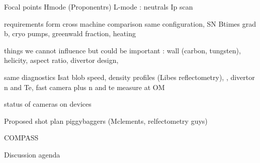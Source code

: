 \documentclass[10pt, compress, draft]{beamer}
\begin{document}
\begin{frame}{Focal points}
	Hmode (Proponentrs)
	L-mode :  neutrals Ip scan
\end{frame}

\begin{frame}{requirements form cross machine comparison }
same configuration, SN Btimes grad b, cryo pumps, greenwald fraction, heating 

things we cannot influence but could be important : wall (carbon, tungsten), helicity, aspect ratio, divertor design, 

same diagnostics Isat blob speed, density profiles (Libes reflectometry), , divertor n and Te, fast camera plus n and te measure at OM

status of cameras on devices


\end{frame}

\begin{frame}{Proposed shot plan}
	piggybaggers (Mclements, relfectometry guys)
	
	COMPASS
\end{frame}

\begin{frame}{Discussion agenda}
	
\end{frame}
\end{document}
